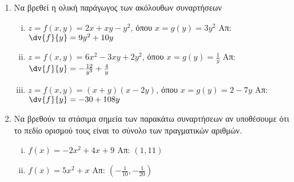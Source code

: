 \begin{enumerate}
  \item Να βρεθεί η ολική παράγωγος των ακόλουθων συναρτήσεων

    \begin{enumerate}[i)]
      \item $ z = f(x,y) = 2x+xy-y^{2} $, όπου $ x = g(y) = 3y^{2} 
        $ \hfill Απ: $ \dv{f}{y} = 9y^{2}+10y $ 
      \item $ z = f(x,y) = 6x^{2}-3xy+2y^{2} $, όπου $ x = g(y) = \frac{1}{y} $
        \hfill Απ: $ \dv{f}{y} = - \frac{12}{y^{3}} + \frac{4}{y} $
      \item $ z = f(x,y) = (x+y)(x-2y) $, όπου $ x = g(y) = 2-7y $
        \hfill Απ: $ \dv{f}{y} = -30 + 108y $ 
    \end{enumerate}




  \item Να βρεθούν τα στάσιμα σημεία των παρακάτω συναρτήσεων αν υποθέσουμε ότι το 
    πεδίο ορισμού τους είναι το σύνολο των πραγματικών αριθμών.

    \begin{enumerate}[i)]
      \item $ f(x) = -2x^{2}+4x+9 $ \hfill Απ: $ (1,11) $
      \item $ f(x) = 5x^{2}+x $ \hfill Απ: $ \left(-\frac{1}{10}, -\frac{1}{20}\right) $ 
    \end{enumerate}


\end{enumerate}

